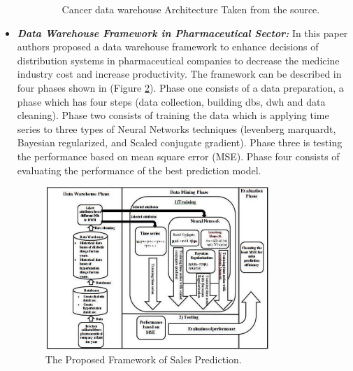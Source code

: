 \begin{itemize}
\begin{enumerate}
\begin{figure}[h!]
      \caption{Cancer data warehouse Architecture Taken from the source.}
      \label{fig:cancersystem}
    \end{figure}
    \end{enumerate}
    \newpage
    \item \textbf{\textit{Data Warehouse Framework in Pharmaceutical Sector:}} In this paper\cite{abd2019proposed} authors proposed a data warehouse framework to enhance decisions of distribution systems in pharmaceutical companies to decrease the medicine industry cost and increase productivity. The framework can be described in four phases shown in (Figure \ref{fig:pharmacysystem}). Phase one consists of a data preparation, a phase which has four steps (data collection, building \gls{db}s, \gls{dwh} and data cleaning). Phase two consists of training the data which is applying time series to three types of Neural Networks techniques (levenberg marquardt, Bayesian regularized, and Scaled conjugate gradient). Phase three is testing the performance based on mean square error (MSE). Phase four consists of evaluating the performance of the best prediction model.
    \begin{figure}[h!]
      \center
      \includegraphics[width=0.80\textwidth]{images/chapter3/relatedwork/pharmacysystem.PNG}
      \caption{The Proposed Framework of Sales Prediction.}
      \label{fig:pharmacysystem}
    \end{figure}
    \newpage
    

\end{itemize}
